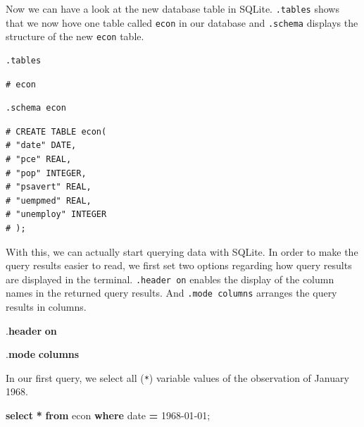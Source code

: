 \documentclass[
  12pt,
]{style/krantz}
\newenvironment{Shaded}{\begin{snugshade}}{\end{snugshade}}
\newcommand{\DataTypeTok}[1]{\textcolor[rgb]{0.13,0.29,0.53}{#1}}
\newcommand{\KeywordTok}[1]{\textcolor[rgb]{0.13,0.29,0.53}{\textbf{#1}}}
\newcommand{\NormalTok}[1]{#1}
\newcommand{\OperatorTok}[1]{\textcolor[rgb]{0.81,0.36,0.00}{\textbf{#1}}}
\newcommand{\StringTok}[1]{\textcolor[rgb]{0.31,0.60,0.02}{#1}}
\begin{document}
Now we can have a look at the new database table in SQLite. \texttt{.tables} shows that we now hove one table called \texttt{econ} in our database and \texttt{.schema} displays the structure of the new \texttt{econ} table.

\begin{verbatim}
.tables
\end{verbatim}

\begin{verbatim}
# econ
\end{verbatim}

\begin{verbatim}
.schema econ
\end{verbatim}

\begin{verbatim}
# CREATE TABLE econ(
# "date" DATE,
# "pce" REAL,
# "pop" INTEGER,
# "psavert" REAL,
# "uempmed" REAL,
# "unemploy" INTEGER
# );
\end{verbatim}

With this, we can actually start querying data with SQLite. In order to make the query results easier to read, we first set two options regarding how query results are displayed in the terminal. \texttt{.header\ on} enables the display of the column names in the returned query results. And \texttt{.mode\ columns} arranges the query results in columns.

\begin{Shaded}
\begin{Highlighting}[]
\NormalTok{.}\KeywordTok{header} \KeywordTok{on}
\end{Highlighting}
\end{Shaded}

\begin{Shaded}
\begin{Highlighting}[]
\NormalTok{.}\KeywordTok{mode} \KeywordTok{columns}
\end{Highlighting}
\end{Shaded}

In our first query, we select all (\texttt{*}) variable values of the observation of January 1968.

\begin{Shaded}
\begin{Highlighting}[]
\KeywordTok{select} \OperatorTok{*} \KeywordTok{from}\NormalTok{ econ }\KeywordTok{where} \DataTypeTok{date} \OperatorTok{=} \StringTok{\textquotesingle{}1968{-}01{-}01\textquotesingle{}}\NormalTok{;}
\end{Highlighting}
\end{Shaded}
\end{document}
